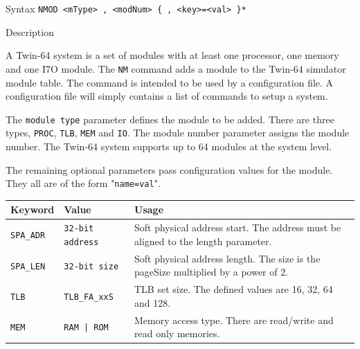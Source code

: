%
%
\pagebreak
{}

\begin{iPageDescEntry}{Syntax}
\texttt{NMOD <mType> , <modNum>  \{ , <key>=<val> \}* } \\
\end{iPageDescEntry}

\begin{iPageDescEntry}{Description}

A Twin-64 system is a set of modules with at least one processor, one memory and one I7O module. The \texttt{NM} command adds a module to the Twin-64 simulator module table. The command is intended to be used by a configuration file. A configuration file will simply contains a list of commands to setup a system. 

The \texttt{module type} parameter defines the module to be added. There are three types, \texttt{PROC}, \texttt{TLB}, \texttt{MEM} and \texttt{IO}. The module number parameter assigns the module number. The Twin-64 system supports up to 64 modules at the system level. 

The remaining optional parameters pass configuration values for the module. They all are of the form "\texttt{name=val}". 

\begin{flushleft}
\begin{tabularx}{\linewidth}{|l|l|X|}
\hline
\textbf{Keyword}  & \textbf{Value} & \textbf{Usage} \\ \hline
\texttt{SPA\_ADR} & \texttt{32-bit address} & Soft physical address start. The address must be aligned to the length parameter. \\ \hline
\texttt{SPA\_LEN} & \texttt{32-bit size} & Soft physical address length. The size is the pageSize multiplied by a power of 2.\\ \hline
\texttt{TLB} & \texttt{TLB\_FA\_xxS} & TLB set size. The defined values are 16, 32, 64 and 128. \\ \hline
\texttt{MEM} & \texttt{RAM | ROM} & Memory access type. There are read/write and read only memories. \\ \hline
\end{tabularx}
\end{flushleft}

\end{iPageDescEntry}

